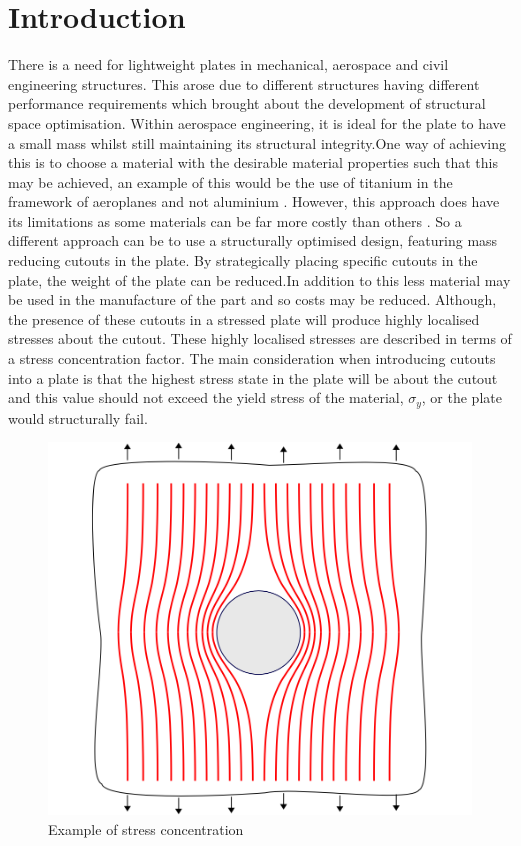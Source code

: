 \documentclass[11pt,twocolumn]{article} %
\begin{document}
\section{Introduction} %
There is a need for lightweight plates in mechanical, aerospace and civil engineering structures. This arose due to different structures having different performance requirements which brought about 
the development of structural space optimisation. Within aerospace engineering, it is ideal for the plate to have a small mass whilst still maintaining its structural integrity.One way of achieving this is to choose a material with the desirable material properties such that this may be achieved, an example of this would be the use of titanium in the framework of aeroplanes and not aluminium \cite{aeroplane}. However, this approach does have its limitations as some materials can be far more costly than others \cite{Titanium}. So a different approach can be to use a structurally optimised design, featuring mass reducing cutouts in the plate. By strategically placing specific cutouts in the plate, the weight of the plate can be reduced.In addition to this less material may be used in the manufacture of the part and so costs may be reduced. Although, the presence of these cutouts in a stressed plate will produce highly localised stresses about the cutout. These highly localised stresses are described in terms of a stress concentration factor.
The main consideration when introducing cutouts into a plate is that the highest stress state in the plate will be about the cutout and this value should not exceed the yield stress of the material, $\sigma_{y}$, or the plate would structurally fail.
\begin{figure}[!ht]
  	\begin{center}
  		\includegraphics[scale=0.15]{Stress.png}
  	\end{center}
  \caption{Example of stress concentration}
\end{figure}
\end{document}
